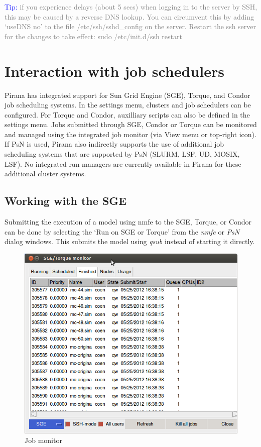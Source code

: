 {{{{\vspace{10pt}
\noindent\scriptsize \textcolor{Blue}{Tip:} \textcolor{Grey} {if you experience delays (about 5 secs) when logging in to the
    server by SSH, this may be caused by a reverse DNS lookup. You can
    circumvent this by adding `useDNS no' to the file
    /etc/ssh/sshd\_config on the server. Restart the ssh server for
    the changes to take effect: sudo /etc/init.d/ssh restart}
  \normalsize

\section{Interaction with job schedulers}
Pirana has integrated support for Sun Grid Engine (SGE), Torque, and
Condor job scheduling systems.  In the settings menu, clusters and job
schedulers can be configured.  For Torque and Condor, auxilliary
scripts can also be defined in the settings menu.  Jobs submitted
through SGE, Condor or Torque can be monitored and managed using the
integrated job monitor (via View menu or top-right
icon).  If PsN is used, Pirana also indirectly supports the use of
additional job scheduling systems that are supported by PsN (SLURM,
LSF, UD, MOSIX, LSF).  No integrated run managers are currently
available in Pirana for these additional cluster systems.

\subsection{Working with the SGE}
Submitting the execution of a model using nmfe to the SGE, Torque, or Condor can be done
by selecting the `Run on SGE or Torque' from the \textit{nmfe} or \textit{PsN} dialog windows.
This submits the model using \textit{qsub} instead of starting it directly. 

\begin{figure}[hbt] \centering
    \includegraphics[scale=0.3]{images/Figure3_1_SGEmonitor.png}
    \caption{Job monitor}
\end{figure}

}}}}
